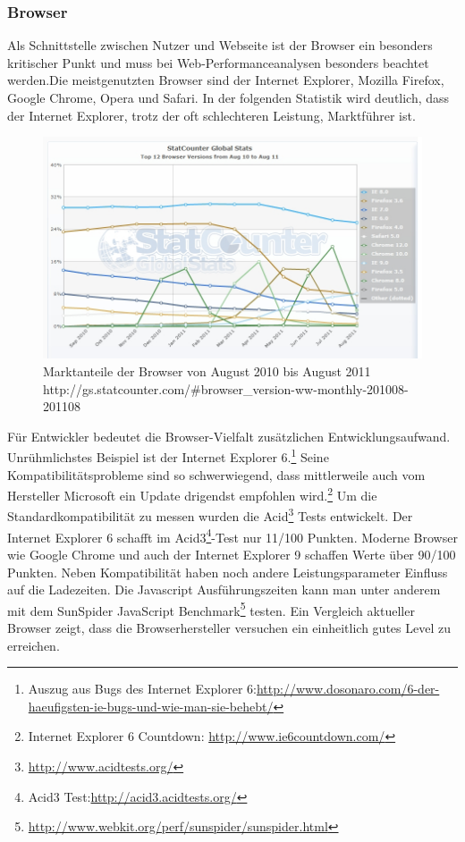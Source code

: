 \subsubsection{Browser}
Als Schnittstelle zwischen Nutzer und Webseite ist der Browser ein besonders kritischer Punkt und muss bei Web-Performanceanalysen besonders beachtet werden.Die meistgenutzten Browser sind der Internet Explorer, Mozilla Firefox, Google Chrome, Opera und Safari. In der folgenden Statistik wird deutlich, dass der Internet Explorer, trotz der oft schlechteren Leistung, Marktführer ist.
\begin{figure}[htbp]
  \centering
  \includegraphics[scale=0.5]{material/browseranteil.jpg}
  \caption{Marktanteile der Browser von August 2010 bis August 2011 http://gs.statcounter.com/#browser_version-ww-monthly-201008-201108}
  \label{fig:browseranteil}
\end{figure}
Für Entwickler bedeutet die Browser-Vielfalt zusätzlichen Entwicklungsaufwand. Unrühmlichstes Beispiel ist der Internet Explorer 6.\footnote{Auszug aus Bugs des Internet Explorer 6:\url{http://www.dosonaro.com/6-der-haeufigsten-ie-bugs-und-wie-man-sie-behebt/}} Seine Kompatibilitätsprobleme sind so schwerwiegend, dass mittlerweile auch vom Hersteller Microsoft ein Update drigendst empfohlen wird.\footnote{Internet Explorer 6 Countdown: \url{http://www.ie6countdown.com/}} Um die Standardkompatibilität zu messen wurden die Acid\footnote{\url{http://www.acidtests.org/}} Tests entwickelt. Der Internet Explorer 6 schafft im Acid3\footnote{Acid3 Test:\url{http://acid3.acidtests.org/}}-Test nur 11/100 Punkten. Moderne Browser wie Google Chrome und auch der Internet Explorer 9 schaffen Werte über 90/100 Punkten. Neben Kompatibilität haben noch andere Leistungsparameter Einfluss auf die Ladezeiten. Die Javascript Ausführungszeiten kann man unter anderem mit dem SunSpider JavaScript Benchmark\footnote{\url{http://www.webkit.org/perf/sunspider/sunspider.html}} testen. Ein Vergleich aktueller Browser zeigt, dass die Browserhersteller versuchen ein einheitlich gutes Level zu erreichen.  
